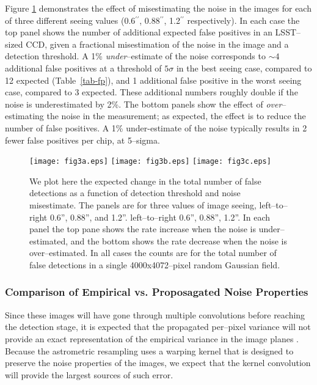\documentclass[floatfix, apj]{emulateapj}
\begin{document}
Figure \ref{fig:3} demonstrates the effect of misestimating the noise in the images for each of three different seeing values (0.6$^{\prime\prime}$, 0.88$^{\prime\prime}$, 1.2$^{\prime\prime}$ respectively).
In each case the top panel shows the number of additional expected false positives in an LSST--sized CCD, given a fractional misestimation of the noise in the image and a detection threshold.
A 1\% {\it under}--estimate of the noise corresponds to $\sim 4$ additional false positives at a threshold of $5\sigma$ in the best seeing case, compared to 12 expected (Table~\ref{tab-fp}), and 1 additional false positive in the worst seeing case, compared to 3 expected.
These additional numbers roughly double if the noise is underestimated by 2\%.
The bottom panels show the effect of {\it over}--estimating the noise in the measurement; as expected, the effect is to reduce the number of false positives.
A 1\% under-estimate of the noise typically results in 2 fewer false positives per chip, at 5--sigma.
\begin{figure}[!ht]
  \texttt{[image: fig3a.eps]}
  \texttt{[image: fig3b.eps]}
  \texttt{[image: fig3c.eps]} \\
  \caption[]{ We plot here the expected change in the total number of false detections as a function of detection threshold and noise misestimate.
    The panels are for three values of image seeing, left--to--right 0.6'', 0.88'', and 1.2''.
    left--to--right 0.6'', 0.88'', 1.2''.
    In each panel the top pane shows the rate increase when the noise is under--estimated, and the bottom shows the rate decrease when the noise is over--estimated.
    In all cases the counts are for the total number of false detections in a single 4000x4072--pixel random Gaussian field.
  }
  \label{fig:3}
\end{figure} 

\subsubsection{Comparison of Empirical vs. Proposagated Noise Properties}



Since these images will have gone through multiple convolutions before reaching the detection stage, it is expected that the propagated per--pixel variance will not provide an exact representation of the empirical variance in the image planes \citep{Price-Stacking}.
Because the astrometric resampling uses a warping kernel that is designed to preserve the noise properties of the images, we expect that the kernel convolution will provide the largest sources of such error.
\end{document}
